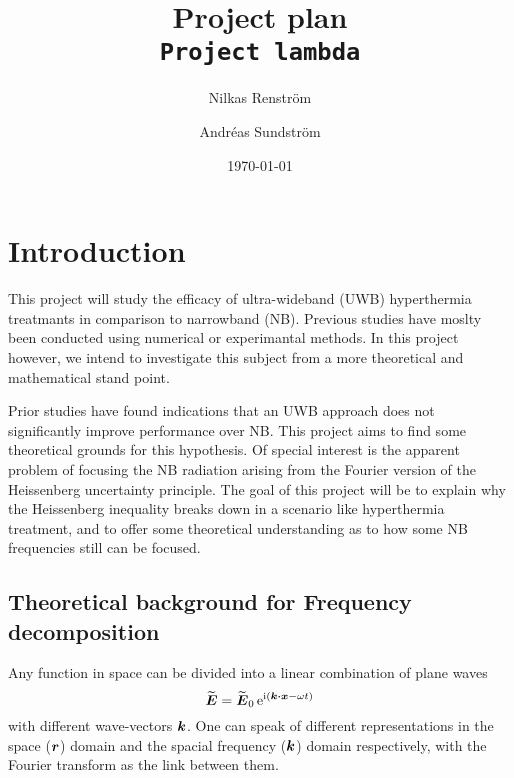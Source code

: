 \documentclass[11pt,a4paper, 
english, swedish %
]{article}
\begin{document}


\title{Project plan\\
      {\Large \texttt{Project lambda}}}
\author{Nilkas Renström \and Andréas Sundström}
\date{\today}

\maketitle




\section{Introduction}

This project will study the efficacy of ultra-wideband (UWB) hyperthermia treatmants in comparison to narrowband (NB). Previous studies have moslty been conducted using numerical or experimantal methods. In this project however, we intend to investigate this subject from a more theoretical and mathematical stand point. 

Prior studies have found indications that an UWB approach does not significantly improve performance over NB. This project aims to find some theoretical grounds for this hypothesis. Of special interest is the apparent problem of focusing the NB radiation arising from the Fourier version of the Heissenberg uncertainty principle. The goal of this project will be to explain why the Heissenberg inequality breaks down in a scenario like hyperthermia treatment, and to offer some theoretical understanding as to how some NB frequencies still can be focused.


\subsection{Theoretical background for Frequency decomposition}
Any function in space can be divided into a linear combination of plane waves 
\begin{equation*}
\widetilde{\vb*E} = \widetilde{\vb*{E}}_0\,\ee^{\ii( \vb*k\vdot\vb*x - \omega t)}
\end{equation*}
with different wave-vectors $\vb*k$. %
One can speak of different representations in the space ($\vb*r$) domain and the spacial frequency ($\vb*k$) domain respectively, with the Fourier transform as the link between them.
\end{document}
